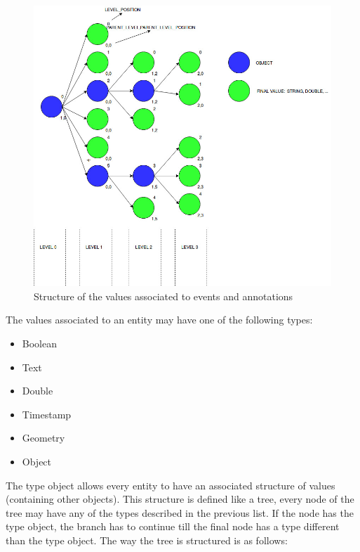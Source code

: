 \begin{figure}[H]
  \begin{center}
	\centering\includegraphics[width=150mm]{../fig/values_structure.jpg}
	\caption{Structure of the values associated to events and annotations}
	\label{fg:values_structure}
  \end{center}
\end{figure}

The values associated to an entity may have one of the following types:

\begin{itemize}

\item Boolean
\item Text
\item Double
\item Timestamp
\item Geometry
\item Object

\end{itemize}

The type object allows every entity to have an associated structure of values (containing other objects). This structure is defined like a tree, every node of the tree may have any of the types described in the previous list. If the node has the type object, the branch has to continue till the final node has a type different than the type object.
The way the tree is structured is as follows:

